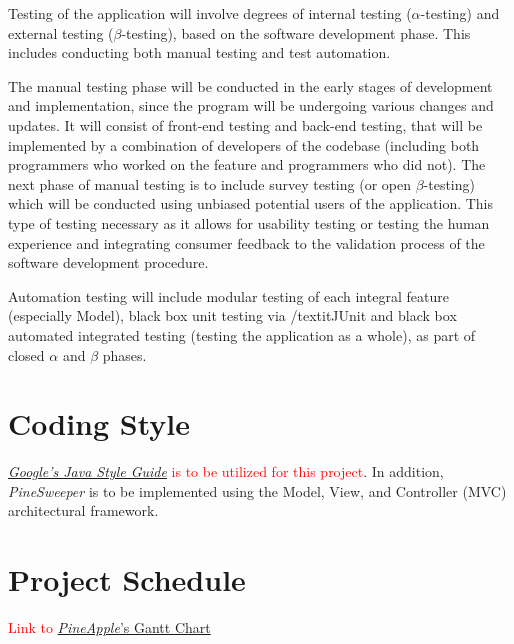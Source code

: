 \documentclass{article}
\begin{document}
\vspace{5mm}
Testing of the application will involve degrees of internal testing ($\alpha$-testing) and external testing ($\beta$-testing), based on the software development phase. This includes conducting both manual testing and test automation.

\vspace{5mm}
The manual testing phase will be conducted in the early stages of development and implementation, since the program will be undergoing
various changes and updates. It will consist of front-end testing and back-end testing, that will be implemented by a combination of
developers of the codebase (including both programmers who worked on the feature and programmers who did not). The next phase of
manual testing is to include survey testing (or open $\beta$-testing) which will be conducted using unbiased potential users of the
application. This type of testing necessary as it allows for usability testing or testing the human experience and integrating consumer
feedback to the validation process of the software development procedure.

\vspace{5mm}
 Automation testing will include modular testing of each integral feature (especially Model), black box unit testing via /textit{JUnit} and black
 box automated integrated testing (testing the application as a whole), as part of closed $\alpha$ and $\beta$ phases.

\section{Coding Style}
\textcolor{red}{\href{https://google.github.io/styleguide/javaguide.html}{\textit{Google's Java Style Guide}} is to be utilized for this project}. In
addition, \textit{PineSweeper} is to be implemented using the Model, View, and Controller (MVC) architectural framework.

\section{Project Schedule}
\textcolor{red}{Link to \href{run:ProjectSchedule.gan} {\textit{PineApple}'s Gantt Chart}}
\end{document}
